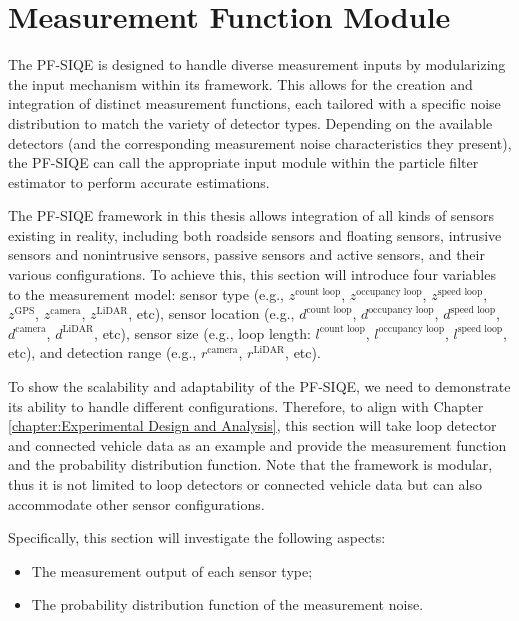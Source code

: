 \section{Measurement Function Module}\label{Measurement Function}
The PF-SIQE is designed to handle diverse measurement inputs by modularizing the input mechanism within its framework. This allows for the creation and integration of distinct measurement functions, each tailored with a specific noise distribution to match the variety of detector types. Depending on the available detectors (and the corresponding measurement noise characteristics they present), the PF-SIQE can call the appropriate input module within the particle filter estimator to perform accurate estimations.

The PF-SIQE framework in this thesis allows integration of all kinds of sensors existing in reality, including both roadside sensors and floating sensors, intrusive sensors and nonintrusive sensors, passive sensors and active sensors, and their various configurations. To achieve this, this section will introduce four variables to the measurement model: sensor type (e.g., $ z^\text{count loop}$, $z^\text{occupancy loop}$, $ z^\text{speed loop}$, $z^\text{GPS}$, $z^\text{camera}$, $z^\text{LiDAR}$, etc), sensor location (e.g., $d^\text{count loop}$, $d^\text{occupancy loop}$, $d^\text{speed loop}$, $d^\text{camera}$, $d^\text{LiDAR}$, etc), sensor size (e.g., loop length: $l^\text{count loop}$, $l^\text{occupancy loop}$, $l^\text{speed loop}$, etc), and detection range (e.g., $r^\text{camera}$, $r^\text{LiDAR}$, etc).

To show the scalability and adaptability of the PF-SIQE, we need to demonstrate its ability to handle different configurations. Therefore, to align with Chapter \ref{chapter:Experimental Design and Analysis}, this section will take loop detector and connected vehicle data as an example and provide the measurement function and the probability distribution function. Note that the framework is modular, thus it is not limited to loop detectors or connected vehicle data but can also accommodate other sensor configurations.

Specifically, this section will investigate the following aspects:
\begin{itemize}
    \item The measurement output of each sensor type;
    \item The probability distribution function of the measurement noise.
\end{itemize}

